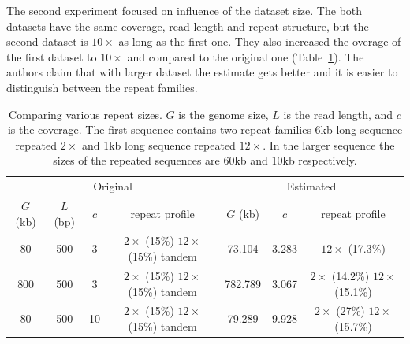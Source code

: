 The second experiment focused on influence of the dataset size. The both datasets have the same coverage, read length and repeat structure, but the second dataset is $10\times$ as long as the first one. They also increased the overage of the first dataset to $10\times$ and compared to the original one (Table~\ref{tab:waterman2}). The authors claim that with larger dataset the estimate gets better and it is easier to distinguish between the repeat families.
\begin{table}[htbp]
\centering
\begin{tabular}{ccccccc}
\toprule
\multicolumn{4}{c}{Original} &
\multicolumn{3}{c}{Estimated} \\
\cmidrule(r{4pt}){1-4} \cmidrule(l){5-7}
$G$ (kb) & $L$ (bp) & $c$ & repeat profile & $G$ (kb) & $c$ & repeat profile\\
\midrule
80 & 500 & 3 & \specialcell[t]{$2\times$ (15\%) \\ $12\times$ (15\%) \\ tandem} & 73.104 & 3.283 & $12\times$ (17.3\%)\\
800 & 500 & 3 & \specialcell[t]{$2\times$ (15\%) \\ $12\times$ (15\%) \\ tandem} & 782.789 & 3.067 & \specialcell[t]{$2\times$ (14.2\%) \\ $12\times$ (15.1\%)}\\
80 & 500 & 10 & \specialcell[t]{$2\times$ (15\%) \\ $12\times$ (15\%) \\ tandem} & 79.289 & 9.928 & \specialcell[t]{$2\times$ (27\%) \\ $12\times$ (15.7\%)}\\
\bottomrule
\end{tabular}
\caption[Comparing various repeat sizes]{Comparing various repeat sizes. $G$ is the genome size, $L$ is the read length, and $c$ is the coverage. The first sequence contains two repeat families 6kb long sequence repeated $2\times$ and 1kb long sequence repeated $12\times$. In the larger sequence the sizes of the repeated sequences are 60kb and 10kb respectively.\cite{waterman}}\label{tab:waterman2}
\end{table}

